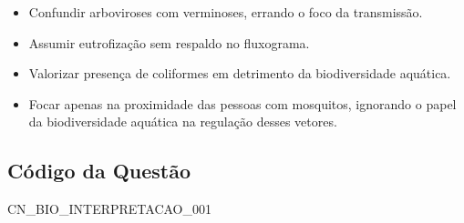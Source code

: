 \documentclass{article}
\begin{document}
\begin{itemize}
  \item Confundir arboviroses com verminoses, errando o foco da transmissão.
  \item Assumir eutrofização sem respaldo no fluxograma.
  \item Valorizar presença de coliformes em detrimento da biodiversidade aquática.
  \item Focar apenas na proximidade das pessoas com mosquitos, ignorando o papel da biodiversidade aquática na regulação desses vetores.
\end{itemize}

\subsection*{Código da Questão}

CN_BIO_INTERPRETACAO_001
\end{document}
